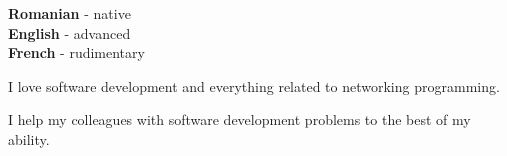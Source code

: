 \documentclass[10pt]{Darie-Dragos_Mitoiu_Document.cls}
\begin{document}
    \begin{minipage}[t]{0.3\textwidth}
        \vspace{-\baselineskip}


        \textbf{Romanian} - native\\
        \textbf{English} - advanced\\
        \textbf{French} - rudimentary
    \end{minipage}
    \hfill
    \begin{minipage}[t]{0.3\textwidth}
        \vspace{-\baselineskip}


        I love software development and everything related to networking programming.
    \end{minipage}
    \hfill
    \begin{minipage}[t]{0.3\textwidth}
        \vspace{-\baselineskip}


        I help my colleagues with software development problems to the best of my ability.
    \end{minipage}

\end{document}
